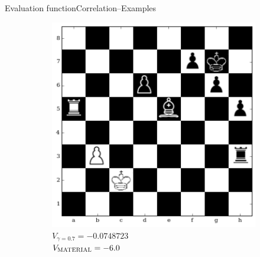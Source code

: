 \documentclass[9pt, unknownkeysallowed]{beamer}
\begin{document}
\begin{frame}{Evaluation function}{Correlation--Examples}
\begin{figure}[h]
\begin{subfigure}[t]{0.3\textwidth}
\includegraphics[width=\textwidth]{../img/table_evaluations/output_33_0.png}
         \caption{$V_{\gamma=0.7} = -0.0748723$\\  
$V_{\textsc{MATERIAL}}= -6.0 $}
    \end{subfigure}
    
    \begin{subfigure}[t]{0.3\textwidth}
        \centering
        

\end{subfigure}
\end{figure}
\end{frame}
\end{document}
